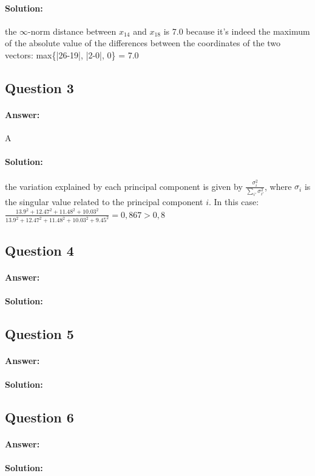 \documentclass[11pt,a4paper]{article}
\begin{document}
\paragraph*{Solution:} the $\infty$-norm distance between $x_{14}$ and $x_{18}$ is 7.0 because it's indeed the maximum of the absolute value of the differences between the coordinates of the two vectors: max\{|26-19|, |2-0|, 0\} = 7.0


\subsection{Question 3}

\paragraph*{Answer:} A
\paragraph*{Solution:} the variation explained by each principal component is given by $\frac{\sigma_i^2}{\sum_{i'} \sigma_{i'}^2}$, where $\sigma_i$ is the singular value related to the principal component $i$. In this case: $\frac{13.9^2+12.47^2+11.48^2+10.03^2}{13.9^2+12.47^2+11.48^2+10.03^2+9.45^2} = 0,867 > 0,8$

\subsection{Question 4}

\paragraph*{Answer:}
\paragraph*{Solution:} 

\subsection{Question 5}

\paragraph*{Answer:}
\paragraph*{Solution:} 

\subsection{Question 6}

\paragraph*{Answer:}
\paragraph*{Solution:} 
\end{document}
